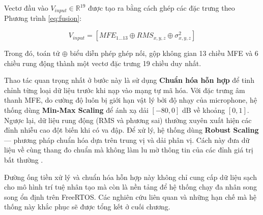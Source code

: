 Vectơ đầu vào $V_{input} \in \mathbb{R}^{19}$ được tạo ra bằng cách ghép các đặc trưng theo Phương trình \ref{eq:fusion}:

\begin{equation}
\label{eq:fusion}
V_{input} = [MFE_{1 \dots 13} \oplus RMS_{x,y,z} \oplus \sigma^2_{x,y,z}]
\end{equation}

Trong đó, toán tử $\oplus$ biểu diễn phép ghép nối, gộp không gian 13 chiều MFE và 6 chiều rung động thành một vectơ đặc trưng 19 chiều duy nhất.

Thao tác quan trọng nhất ở bước này là sử dụng \textbf{Chuẩn hóa hỗn hợp} để tinh chỉnh từng loại dữ liệu trước khi nạp vào mạng tự mã hóa. Với đặc trưng âm thanh MFE, do cường độ luôn bị giới hạn vật lý bởi độ nhạy của microphone, hệ thống dùng \textbf{Min-Max Scaling} để ánh xạ dải $[-80, 0]$ dB về khoảng $[0, 1]$. Ngược lại, dữ liệu rung động (RMS và phương sai) thường xuyên xuất hiện các đỉnh nhiễu cao đột biến khi có va đập. Để xử lý, hệ thống dùng \textbf{Robust Scaling} — phương pháp chuẩn hóa dựa trên trung vị và dải phân vị. Cách này đưa dữ liệu về cùng thang đo chuẩn mà không làm lu mờ thông tin của các đỉnh giá trị bất thường \cite{ref_1_8}.

Đường ống tiền xử lý và chuẩn hóa hỗn hợp này không chỉ cung cấp dữ liệu sạch cho mô hình trí tuệ nhân tạo mà còn là nền tảng để hệ thống chạy đa nhân song song ổn định trên FreeRTOS. Các nghiên cứu liên quan và những hạn chế mà hệ thống này khắc phục sẽ được tổng kết ở cuối chương.

